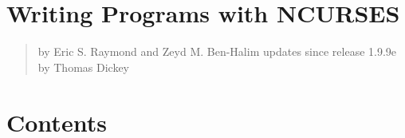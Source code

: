 % 
% 

\chapter{Writing Programs with NCURSES}

\label{f0}\begin{quotation} by Eric S. Raymond and Zeyd M. Ben-Halim\newline
updates since release 1.9.9e by Thomas Dickey\end{quotation}

\chapter{Contents}

